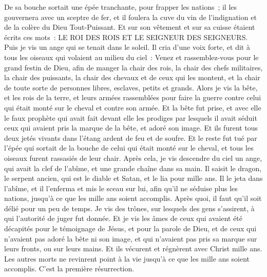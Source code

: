 \begin{multicols}{2}
De sa bouche sortait une épée tranchante, pour frapper les nations~; il les gouvernera avec un sceptre de fer, et il foulera la cuve du vin de l'indignation et de la colère du Dieu Tout-Puissant.
Et sur son vêtement et sur sa cuisse étaient écrits ces mots~: LE ROI DES ROIS ET LE SEIGNEUR DES SEIGNEURS.
Puis je vis un ange qui se tenait dans le soleil. Il cria d'une voix forte, et dit à tous les oiseaux qui volaient au milieu du ciel~: Venez et rassemblez-vous pour le grand festin de Dieu,
afin de manger la chair des rois, la chair des chefs militaires, la chair des puissants, la chair des chevaux et de ceux qui les montent, et la chair de toute sorte de personnes libres, esclaves, petits et grands.
Alors je vis la bête, et les rois de la terre, et leurs armées rassemblées pour faire la guerre contre celui qui était monté sur le cheval et contre son armée.
Et la bête fut prise, et avec elle le faux prophète qui avait fait devant elle les prodiges par lesquels il avait séduit ceux qui avaient pris la marque de la bête, et adoré son image. Et ils furent tous deux jetés vivants dans l'étang ardent de feu et de soufre.
Et le reste fut tué par l'épée qui sortait de la bouche de celui qui était monté sur le cheval, et tous les oiseaux furent rassasiés de leur chair.
\VerseOne{}Après cela, je vis descendre du ciel un ange, qui avait la clef de l'abîme, et une grande chaîne dans sa main.
Il saisit le dragon, le serpent ancien, qui est le diable et Satan, et le lia pour mille ans.
Il le jeta dans l'abîme, et il l'enferma et mis le sceau sur lui, afin qu'il ne séduise plus les nations, jusqu'à ce que les mille ans soient accomplis. Après quoi, il faut qu'il soit délié pour un peu de temps.
Je vis des trônes, sur lesquels des gens s'assirent, à qui l'autorité de juger fut donnée. Et je vis les âmes de ceux qui avaient été décapités pour le témoignage de Jésus, et pour la parole de Dieu, et de ceux qui n'avaient pas adoré la bête ni son image, et qui n'avaient pas pris sa marque sur leurs fronts, ou sur leurs mains. Et ils vécurent et régnèrent avec Christ mille ans.
Les autres morts ne revinrent point à la vie jusqu'à ce que les mille ans soient accomplis. C'est la première résurrection.

\end{multicols}
